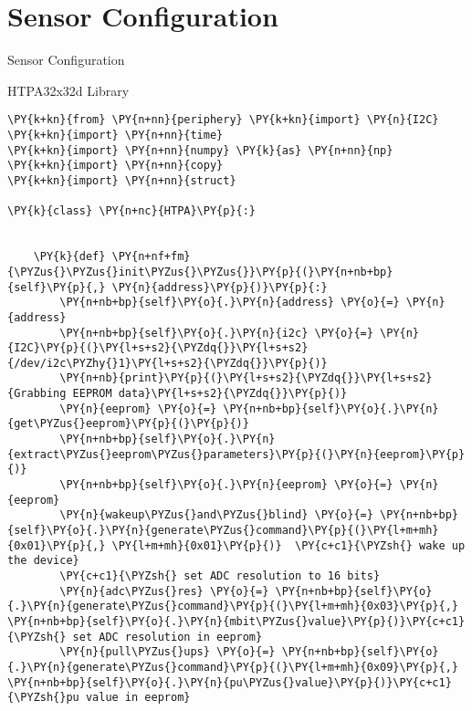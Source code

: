 

    
    \hypertarget{sensor-configuration}{%
\section{\textbf{Sensor Configuration}}{Sensor Configuration}\label{sensor-configuration}}

    HTPA32x32d Library

    \begin{tcolorbox}[breakable, size=fbox, boxrule=1pt, pad at break*=1mm,colback=cellbackground, colframe=cellborder]
\begin{Verbatim}[commandchars=\\\{\}]
\PY{k+kn}{from} \PY{n+nn}{periphery} \PY{k+kn}{import} \PY{n}{I2C}
\PY{k+kn}{import} \PY{n+nn}{time}
\PY{k+kn}{import} \PY{n+nn}{numpy} \PY{k}{as} \PY{n+nn}{np}
\PY{k+kn}{import} \PY{n+nn}{copy}
\PY{k+kn}{import} \PY{n+nn}{struct}

\PY{k}{class} \PY{n+nc}{HTPA}\PY{p}{:}


	\PY{k}{def} \PY{n+nf+fm}{\PYZus{}\PYZus{}init\PYZus{}\PYZus{}}\PY{p}{(}\PY{n+nb+bp}{self}\PY{p}{,} \PY{n}{address}\PY{p}{)}\PY{p}{:}
		\PY{n+nb+bp}{self}\PY{o}{.}\PY{n}{address} \PY{o}{=} \PY{n}{address}
		\PY{n+nb+bp}{self}\PY{o}{.}\PY{n}{i2c} \PY{o}{=} \PY{n}{I2C}\PY{p}{(}\PY{l+s+s2}{\PYZdq{}}\PY{l+s+s2}{/dev/i2c\PYZhy{}1}\PY{l+s+s2}{\PYZdq{}}\PY{p}{)}
		\PY{n+nb}{print}\PY{p}{(}\PY{l+s+s2}{\PYZdq{}}\PY{l+s+s2}{Grabbing EEPROM data}\PY{l+s+s2}{\PYZdq{}}\PY{p}{)}
		\PY{n}{eeprom} \PY{o}{=} \PY{n+nb+bp}{self}\PY{o}{.}\PY{n}{get\PYZus{}eeprom}\PY{p}{(}\PY{p}{)}
		\PY{n+nb+bp}{self}\PY{o}{.}\PY{n}{extract\PYZus{}eeprom\PYZus{}parameters}\PY{p}{(}\PY{n}{eeprom}\PY{p}{)}
		\PY{n+nb+bp}{self}\PY{o}{.}\PY{n}{eeprom} \PY{o}{=} \PY{n}{eeprom}
		\PY{n}{wakeup\PYZus{}and\PYZus{}blind} \PY{o}{=} \PY{n+nb+bp}{self}\PY{o}{.}\PY{n}{generate\PYZus{}command}\PY{p}{(}\PY{l+m+mh}{0x01}\PY{p}{,} \PY{l+m+mh}{0x01}\PY{p}{)}  \PY{c+c1}{\PYZsh{} wake up the device}
		\PY{c+c1}{\PYZsh{} set ADC resolution to 16 bits}
		\PY{n}{adc\PYZus{}res} \PY{o}{=} \PY{n+nb+bp}{self}\PY{o}{.}\PY{n}{generate\PYZus{}command}\PY{p}{(}\PY{l+m+mh}{0x03}\PY{p}{,} \PY{n+nb+bp}{self}\PY{o}{.}\PY{n}{mbit\PYZus{}value}\PY{p}{)}\PY{c+c1}{\PYZsh{} set ADC resolution in eeprom}
		\PY{n}{pull\PYZus{}ups} \PY{o}{=} \PY{n+nb+bp}{self}\PY{o}{.}\PY{n}{generate\PYZus{}command}\PY{p}{(}\PY{l+m+mh}{0x09}\PY{p}{,} \PY{n+nb+bp}{self}\PY{o}{.}\PY{n}{pu\PYZus{}value}\PY{p}{)}\PY{c+c1}{\PYZsh{}pu value in eeprom}


\end{Verbatim}
\end{tcolorbox}
